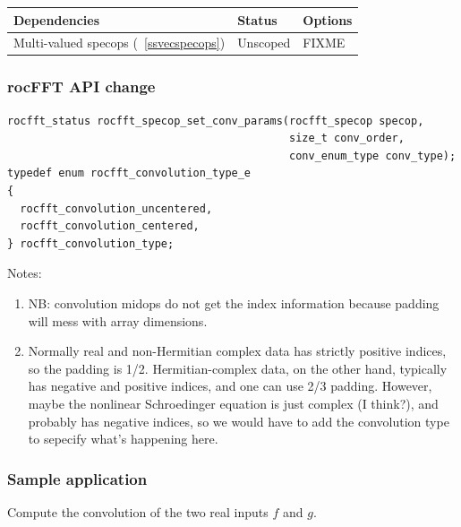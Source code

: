 \documentclass[12pt]{article}
\renewcommand{\(}{\left(}
\renewcommand{\)}{\right)}
\begin{document}
\begin{center}
  \begin{tabular}{|l|l|p{5cm}|}
    \hline
    Dependencies & Status & Options \\
    \hline
    Multi-valued specops (~\ref{ssvecspecops}) & Unscoped   & FIXME \\
    \hline
  \end{tabular}
\end{center}
\noindent


\subsubsection{rocFFT API change}
\begin{lstlisting}
rocfft_status rocfft_specop_set_conv_params(rocfft_specop specop,
                                            size_t conv_order,
                                            conv_enum_type conv_type);
typedef enum rocfft_convolution_type_e
{
  rocfft_convolution_uncentered,
  rocfft_convolution_centered,
} rocfft_convolution_type;

\end{lstlisting}
Notes:
\begin{enumerate}
\item NB: convolution midops do not get the index information because
  padding will mess with array dimensions.
\item Normally real and non-Hermitian complex data has strictly
  positive indices, so the padding is 1/2.  Hermitian-complex data, on
  the other hand, typically has negative and positive indices, and one
  can use 2/3 padding.  However, maybe the nonlinear Schroedinger
  equation is just complex (I think?), and probably has negative
  indices, so we would have to add the convolution type to sepecify
  what's happening here.
\end{enumerate}

\subsubsection{Sample application}

Compute the convolution of the two real inputs $f$ and $g$.
\end{document}
